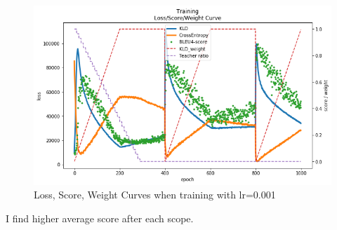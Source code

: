 \documentclass[12pt]{article}
\begin{document}
\begin{figure}[H]
\centering
\includegraphics[width=\linewidth]{Images/curvesv3.png} 
\caption{Loss, Score, Weight Curves when training with lr=0.001}
\end{figure}

I find higher average score after each scope.

 
\end{document}
